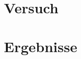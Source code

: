 
\section{Versuch}
\begin{quote}
    
\end{quote}


\section{Ergebnisse}
\begin{quote}
    
\end{quote}




%     
%         





